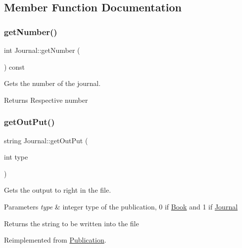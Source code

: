 \subsection{Member Function Documentation}
\mbox{\label{class_journal_ae2ee9253549e4748814119dd8ad01d2c}} 
\subsubsection{\texorpdfstring{get\+Number()}{getNumber()}}
{\footnotesize\ttfamily int Journal\+::get\+Number (\begin{DoxyParamCaption}{ }\end{DoxyParamCaption}) const}



Gets the number of the journal. 

\begin{DoxyReturn}{Returns}
Respective number 
\end{DoxyReturn}
\mbox{\label{class_journal_a631e4fa39c9875db342ed8eb1a9f5eb6}} 
\subsubsection{\texorpdfstring{get\+Out\+Put()}{getOutPut()}}
{\footnotesize\ttfamily string Journal\+::get\+Out\+Put (\begin{DoxyParamCaption}\item[{int}]{type }\end{DoxyParamCaption})\hspace{0.3cm}{\ttfamily [virtual]}}



Gets the output to right in the file. 


\begin{DoxyParams}{Parameters}
{\em type} & integer type of the publication, 0 if \hyperlink{class_book}{Book} and 1 if \hyperlink{class_journal}{Journal}\\
\hline
\end{DoxyParams}
\begin{DoxyReturn}{Returns}
the string to be written into the file 
\end{DoxyReturn}


Reimplemented from \hyperlink{class_publication_af382f9557807e8375478ceb7890e841f}{Publication}.

